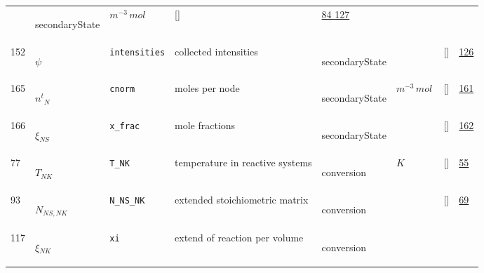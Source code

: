 \begin{longtable}{|p{1cm}|p{3cm}|p{3cm}|p{7cm}|p{3.0cm}|p{3cm}|p{2cm}|p{1cm}|}
             & \begin{lay}secondaryState \end{lay}
             & $ m^{-3} \,mol \, $
             & []
             & \hyperlink{"e:84"}{ 84 }
                 \hyperlink{"e:127"}{ 127 }
                 \\
    152
             & \hypertarget{"v:152"}{ $ {\psi}{_{}} $}
             & \verb|intensities|
             & collected intensities
             & \begin{lay}secondaryState \end{lay}
             & $  $
             & []
             & \hyperlink{"e:126"}{ 126 }
                 \\
    165
             & \hypertarget{"v:165"}{ $ {n^{t}}{_{N}} $}
             & \verb|cnorm|
             & moles per node
             & \begin{lay}secondaryState \end{lay}
             & $ m^{-3} \,mol \, $
             & []
             & \hyperlink{"e:161"}{ 161 }
                 \\
    166
             & \hypertarget{"v:166"}{ $ {\xi}{_{{N S}}} $}
             & \verb|x_frac|
             & mole fractions 
             & \begin{lay}secondaryState \end{lay}
             & $  $
             & []
             & \hyperlink{"e:162"}{ 162 }
                 \\
    77
             & \hypertarget{"v:77"}{ $ {T}{_{{N K}}} $}
             & \verb|T_NK|
             & temperature in reactive systems
             & \begin{lay}conversion \end{lay}
             & $ K \, $
             & []
             & \hyperlink{"e:55"}{ 55 }
                 \\
    93
             & \hypertarget{"v:93"}{ $ {N}{_{{N S}, {N K}}} $}
             & \verb|N_NS_NK|
             & extended stoichiometric matrix
             & \begin{lay}conversion \end{lay}
             & $  $
             & []
             & \hyperlink{"e:69"}{ 69 }
                 \\
    117
             & \hypertarget{"v:117"}{ $ {\xi}{_{{N K}}} $}
             & \verb|xi|
             & extend of reaction per volume
             & \begin{lay}conversion \end{lay}

\end{longtable}
